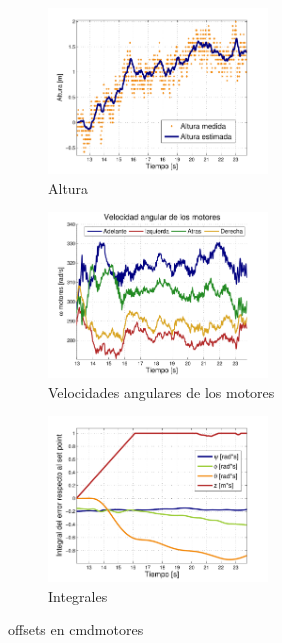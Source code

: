 \documentclass[main]{subfiles}
\begin{document}
\begin{figure}
	\centering
	\vspace{-10pt}
	\includegraphics[width=0.52\textwidth]{./pics_test_control/z.pdf}
	\caption{Altura}
	\label{fig:z}
\end{figure}

\begin{figure}
	\centering
	\vspace{-10pt}
	\includegraphics[width=0.52\textwidth]{./pics_test_control/w.pdf}
	\caption{Velocidades angulares de los motores}
	\label{fig:w}
\end{figure}

\begin{figure}
	\centering
	\vspace{-10pt}
	\includegraphics[width=0.52\textwidth]{./pics_test_control/int.pdf}
	\caption{Integrales}
	\label{fig:int}
\end{figure}

offsets en cmdmotores
\end{document}

